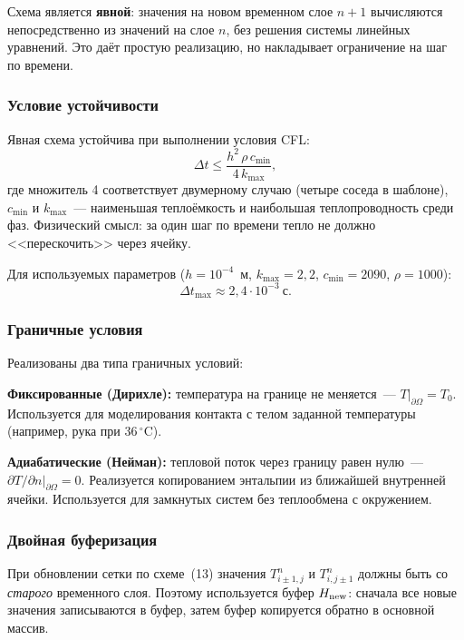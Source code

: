 Схема является \textbf{явной}: значения на новом временном слое $n+1$
вычисляются непосредственно из значений на слое $n$, без решения
системы линейных уравнений. Это даёт простую реализацию, но накладывает
ограничение на шаг по времени.

\subsubsection{Условие устойчивости}

Явная схема устойчива при выполнении условия CFL:
\begin{equation}\label{eq:cfl}
  \Delta t \le \frac{h^2\,\rho\,c_{\min}}{4\,k_{\max}},
\end{equation}
где множитель 4 соответствует двумерному случаю (четыре соседа в шаблоне),
$c_{\min}$ и $k_{\max}$~--- наименьшая теплоёмкость и наибольшая
теплопроводность среди фаз. Физический смысл: за один шаг по времени
тепло не должно <<перескочить>> через ячейку.

Для используемых параметров ($h = 10^{-4}$~м, $k_{\max} = 2{,}2$,
$c_{\min} = 2090$, $\rho = 1000$):
\[
  \Delta t_{\max} \approx 2{,}4 \cdot 10^{-3}~\text{с}.
\]

\subsubsection{Граничные условия}

Реализованы два типа граничных условий:

\textbf{Фиксированные (Дирихле):}
температура на границе не меняется~--- $T|_{\partial\Omega} = T_0$.
Используется для моделирования контакта с телом заданной температуры
(например, рука при $36\,^{\circ}$C).

\textbf{Адиабатические (Нейман):}
тепловой поток через границу равен нулю~---
$\partial T / \partial n|_{\partial\Omega} = 0$.
Реализуется копированием энтальпии из ближайшей внутренней ячейки.
Используется для замкнутых систем без теплообмена с окружением.

\subsubsection{Двойная буферизация}

При обновлении сетки по схеме~(13) значения $T_{i\pm1,j}^n$
и $T_{i,j\pm1}^n$ должны быть со \textit{старого} временного слоя.
Поэтому используется буфер $H_{\rm new}$: сначала все новые значения
записываются в буфер, затем буфер копируется обратно в основной массив.

